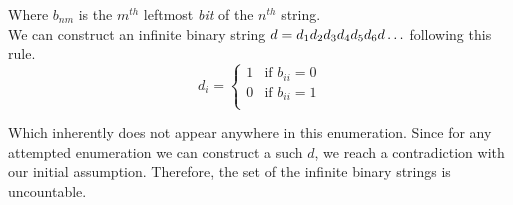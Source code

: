 \documentclass[11pt]{article}
\begin{document}
\begin{enumerate}[label=\textbf{\alph*)}]
\begin{enumerate}[label=\arabic*-]
	\end{enumerate}
		Where $b_{nm}$ is the $m^{th}$ leftmost \textit{bit} of the $n^{th}$ string.\\
		We can construct an infinite binary string $d = d_1d_2d_3d_4d_5d_6d\mathellipsis$ following this rule.\\

		\[ d_i = \begin{cases}
			1 & \text{if $b_{ii} = 0$} \\
			0 & \text{if $b_{ii} = 1$} \\
		\end{cases}
		\]

		Which inherently does not appear anywhere in this enumeration. Since for any attempted enumeration we can construct a such $d$, we reach a contradiction with our initial assumption. Therefore, the set of the infinite binary strings is uncountable.
		


		
		

\end{enumerate}

\newpage
\end{document}
